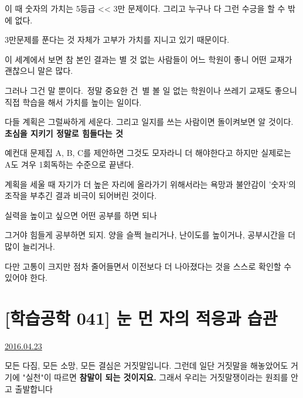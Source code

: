 이 때 숫자의 가치는 5등급 << 3만 문제이다. 그리고 누구나 다 그런 수긍을 할 수 밖에 없다.
\vspace{5mm}

3만문제를 푼다는 것 자체가 고부가 가치를 지니고 있기 때문이다.
\vspace{5mm}

이 세계에서 보면 참 본인 결과는 별 것 없는 사람들이 어느 학원이 좋니 어떤 교재가 괜찮으니 말은 많다.
\vspace{5mm}

그러나 그건 말 뿐이다. 정말 중요한 건 별 볼 일 없는 학원이나 쓰레기 교재도 좋으니 직접 학습을 해서 가치를 높이는 일이다.
\vspace{5mm}

다들 계획은 그럴싸하게 세운다. 그리고 일지를 쓰는 사람이면 돌이켜보면 알 것이다. \textbf{초심을 지키기 정말로 힘들다는 것}
\vspace{5mm}

예컨대 문제집 A, B, C를 제안하면 그것도 모자라니 더 해야한다고 하지만 실제로는 A도 겨우 1회독하는 수준으로 끝낸다.
\vspace{5mm}

계획을 세울 때 자기가 더 높은 자리에 올라가기 위해서라는 욕망과 불안감이 '숫자'의 조작을 부추긴 결과 비극이 되어버린 것이다.
\vspace{5mm}

실력을 높이고 싶으면 어떤 공부를 하면 되나
\vspace{5mm}

그거야 힘들게 공부하면 되지. 양을 슬쩍 늘리거나, 난이도를 높이거나, 공부시간을 더 많이 늘리거나.
\vspace{5mm}

다만 고통이 크지만 점차 줄어들면서 이전보다 더 나아졌다는 것을 스스로 확인할 수 있어야 한다.
\vspace{5mm}






\section{[학습공학 041] 눈 먼 자의 적응과 습관}
\href{https://www.kockoc.com/Apoc/742683}{2016.04.23}

\vspace{5mm}

모든 다짐, 모든 소망, 모든 결심은 거짓말입니다.
그런데 일단 거짓말을 해놓았어도 거기에 "실천"이 따르면 \textbf{참말이 되는 것이지요.}
그래서 우리는 거짓말쟁이라는 원죄를 안고 출발합니다
\vspace{5mm}

